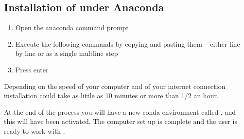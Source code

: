\documentclass[letterpaper,10pt,english]{jupyterBook}
\begin{document}
\subsection{Installation of  under Anaconda}
\label{\detokenize{content/03_Installation/InstallingModelFlow:installation-of-modelflow-under-anaconda}}\begin{enumerate}
%
\item {} 
\sphinxAtStartPar
Open the anaconda command prompt

\item {} 
\sphinxAtStartPar
Execute the following commands by copying and pasting them – either line by line or as a single mult\sphinxhyphen{}line step

\item {} 
\sphinxAtStartPar
Press enter

\end{enumerate}

\begin{sphinxVerbatim}[commandchars=\\\{\}]
          
  
  
     
    
   
   
   

\end{sphinxVerbatim}

\sphinxAtStartPar
Depending on the speed of your computer and of your internet connection installation could take as little as 10 minutes or more than 1/2 an hour.

\sphinxAtStartPar
At the end of the process you will have a new conda environment called , and this will have been activated. The computer set up is complete and the user is ready to work with .
\end{document}
